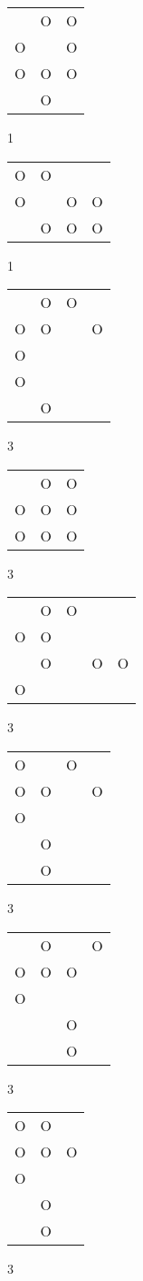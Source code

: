 \begin{tabular}{|m{0.2cm}m{0.2cm}m{0.2cm}|}\hline
 &O&O\\
O& &O\\
O&O&O\\
 &O& \\
\hline\end{tabular}1
\begin{tabular}{|m{0.2cm}m{0.2cm}m{0.2cm}m{0.2cm}|}\hline
O&O& & \\
O& &O&O\\
 &O&O&O\\
\hline\end{tabular}1
\begin{tabular}{|m{0.2cm}m{0.2cm}m{0.2cm}m{0.2cm}|}\hline
 &O&O& \\
O&O& &O\\
O& & & \\
O& & & \\
 &O& & \\
\hline\end{tabular}3
\begin{tabular}{|m{0.2cm}m{0.2cm}m{0.2cm}|}\hline
 &O&O\\
O&O&O\\
O&O&O\\
\hline\end{tabular}3
\begin{tabular}{|m{0.2cm}m{0.2cm}m{0.2cm}m{0.2cm}m{0.2cm}|}\hline
 &O&O& & \\
O&O& & & \\
 &O& &O&O\\
O& & & & \\
\hline\end{tabular}3
\begin{tabular}{|m{0.2cm}m{0.2cm}m{0.2cm}m{0.2cm}|}\hline
O& &O& \\
O&O& &O\\
O& & & \\
 &O& & \\
 &O& & \\
\hline\end{tabular}3
\begin{tabular}{|m{0.2cm}m{0.2cm}m{0.2cm}m{0.2cm}|}\hline
 &O& &O\\
O&O&O& \\
O& & & \\
 & &O& \\
 & &O& \\
\hline\end{tabular}3
\begin{tabular}{|m{0.2cm}m{0.2cm}m{0.2cm}|}\hline
O&O& \\
O&O&O\\
O& & \\
 &O& \\
 &O& \\
\hline\end{tabular}3
